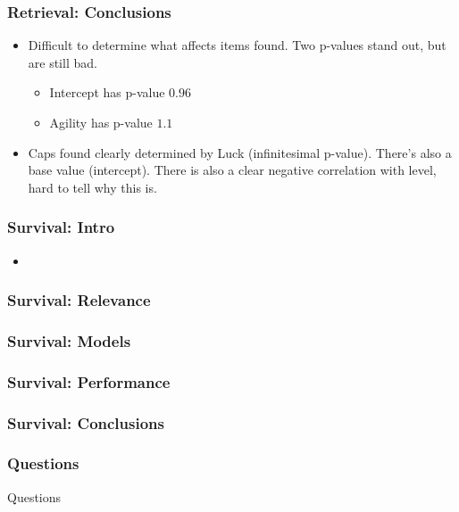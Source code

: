 \documentclass{beamer}
\begin{document}
\begin{frame}
  \frametitle{Retrieval: Conclusions}
  \begin{itemize}
  \item Difficult to determine what affects items found. Two p-values stand out, but are still bad.
    \begin{itemize}
    \item Intercept has p-value $0.96$
    \item Agility has p-value $1.1$
    \end{itemize}
  \item Caps found clearly determined by Luck (infinitesimal p-value). There's also a base value (intercept). There is also a clear negative correlation with level, hard to tell why this is.
  \end{itemize}
\end{frame}


\begin{frame}
  \frametitle{Survival: Intro}
  \begin{itemize}
  \item 
  \end{itemize}
\end{frame}


\begin{frame}
  \frametitle{Survival: Relevance}
  
\end{frame}


\begin{frame}
  \frametitle{Survival: Models}
  
\end{frame}


\begin{frame}
  \frametitle{Survival: Performance}
  
\end{frame}


\begin{frame}
  \frametitle{Survival: Conclusions}
  
\end{frame}


\begin{frame}
  \frametitle{Questions}
  {\Huge Questions}
\end{frame}
\end{document}
